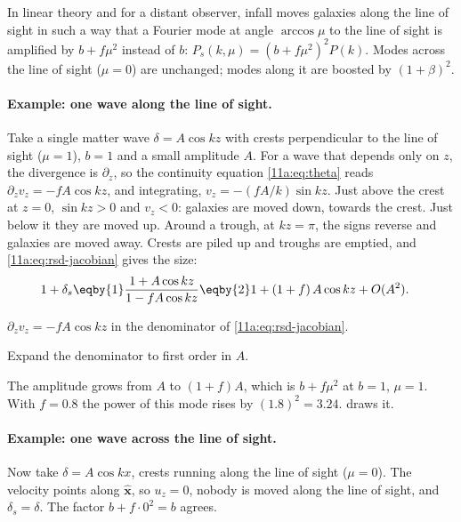 \begin{keyidea}
In linear theory and for a distant observer, infall moves galaxies along the
line of sight in such a way that a Fourier mode at angle $\arccos\mu$ to the
line of sight is amplified by $b+f\mu^2$ instead of $b$:
$P_s(k,\mu)=(b+f\mu^2)^2P(k)$. Modes across the line of sight ($\mu=0$) are
unchanged; modes along it are boosted by $(1+\beta)^2$.
\end{keyidea}

\paragraph{Example: one wave along the line of sight.}
Take a single matter wave $\delta=A\cos kz$ with crests perpendicular to the line
of sight ($\mu=1$), $b=1$ and a small amplitude $A$. For a wave that depends only
on $z$, the divergence is $\partial_z$, so the continuity equation
\eqref{11a:eq:theta} reads $\partial_zv_z=-fA\cos kz$, and integrating,
$v_z=-(fA/k)\sin kz$. Just above the crest at $z=0$, $\sin kz>0$ and $v_z<0$:
galaxies are moved down, towards the crest. Just below it they are moved up.
Around a trough, at $kz=\pi$, the signs reverse and galaxies are moved away.
Crests are piled up and troughs are emptied, and
\eqref{11a:eq:rsd-jacobian} gives the size:
\begin{align*}
  1+\delta_s
  &\eqby{1}\frac{1+A\cos kz}{1-fA\cos kz}
   \eqby{2}1+(1+f)\,A\cos kz+O(A^2).
\end{align*}
\begin{explain}
  \item $\partial_zv_z=-fA\cos kz$ in the denominator of
        \eqref{11a:eq:rsd-jacobian}.
  \item Expand the denominator to first order in $A$.
\end{explain}
The amplitude grows from $A$ to $(1+f)A$, which is $b+f\mu^2$ at $b=1$, $\mu=1$.
With $f=0.8$ the power of this mode rises by $(1.8)^2=3.24$.
 draws it.

\paragraph{Example: one wave across the line of sight.}
Now take $\delta=A\cos kx$, crests running along the line of sight ($\mu=0$).
The velocity points along $\hat{\bm x}$, so $u_z=0$, nobody is moved along the
line of sight, and $\delta_s=\delta$. The factor $b+f\cdot0^2=b$ agrees.

